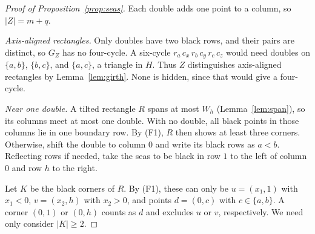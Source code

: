 \begin{proof}[Proof of Proposition~\ref{prop:seas}]
Each double adds one point to a column, so $|Z|=m+q$.

\emph{Axis-aligned rectangles.} Only doubles have two black rows, and their pairs are distinct,
so $G_Z$ has no four-cycle. A six-cycle $r_a\,c_x\,r_b\,c_y\,r_c\,c_z$ would need doubles on
$\{a,b\}$, $\{b,c\}$, and $\{a,c\}$, a triangle in $H$. Thus $Z$ distinguishes axis-aligned rectangles by Lemma~\ref{lem:girth}.
None is hidden, since that would give a four-cycle.

\emph{Near one double.} A tilted rectangle $R$ spans at most $W_h$
(Lemma~\ref{lem:span}), so its columns meet at most one double. With no double,
all black points in those columns lie in one boundary row. By (F1), $R$ then
shows at least three corners. Otherwise, shift the double to column $0$
and write its black rows as $a<b$. Reflecting rows if needed, take the seas
to be black in row $1$ to the left of column $0$ and row $h$ to the right.

Let $K$ be the black corners of $R$. By (F1), these can only be
$u=(x_1,1)$ with $x_1<0$, $v=(x_2,h)$ with $x_2>0$, and points $d=(0,c)$
with $c\in\{a,b\}$. A corner $(0,1)$ or $(0,h)$ counts as $d$ and
excludes $u$ or $v$, respectively. We need only consider $|K|\ge2$.


\end{proof}
